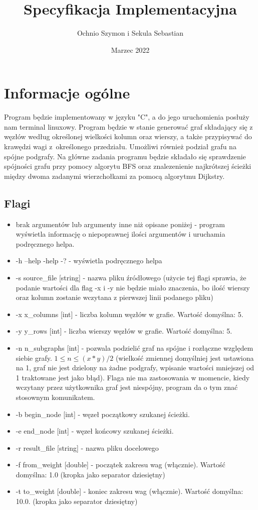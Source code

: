 \documentclass{article}
\title{Specyfikacja Implementacyjna}
\author{Ochnio Szymon i Sekula Sebastian}
\date{Marzec 2022}
\begin{document}
\maketitle

\section{Informacje ogólne}
Program będzie implementowany w języku "C", a do jego uruchomienia posłuży nam terminal linuxowy.
Program będzie w stanie generować graf składający się z węzłów według określonej wielkości kolumn oraz wierszy, a także przypisywać do krawędzi wagi z~określonego przedziału. Umożliwi również podział grafu na spójne podgrafy. Na główne zadania programu będzie składało się sprawdzenie spójności grafu przy pomocy algorytu BFS oraz znalezenienie najkrótszej ścieżki między dwoma zadanymi wierzchołkami za pomocą algorytmu Dijkstry.
\subsection{Flagi}
\begin{itemize}
    \item brak argumentów lub argumenty inne niż opisane poniżej - program wyświetla informację o niepoprawnej ilości argumentów i uruchamia podręcznego helpa.
    \item -h \textbar--help  \textbar-help \textbar-? - wyświetla podręcznego helpa
    \item -s source\_file [string] - nazwa pliku źródłowego (użycie tej flagi sprawia, że podanie wartości dla flag -x i -y nie będzie miało znaczenia, bo ilość wierszy oraz kolumn zostanie wczytana z pierwszej linii podanego pliku)
    \item -x x\_columns [int] - liczba kolumn węzłów w grafie. Wartość domyślna: 5.
    \item -y y\_rows [int] - liczba wierszy węzłów w grafie. Wartość domyślna: 5.
    \item -n n\_subgraphs [int] - pozwala podzielić graf na spójne i rozłączne względem siebie grafy. ${1 \leq n \leq (x*y)/2}$ (wielkość zmiennej domyślniej jest ustawiona na 1, graf nie jest dzielony na żadne podgrafy, wpisanie wartości mniejszej od 1 traktowane jest jako błąd). Flaga nie ma zastosowania w momencie, kiedy wczytany przez użytkownika graf jest niespójny, program da o tym znać stosownym komunikatem.
    \item -b begin\_node [int] - węzeł początkowy szukanej ścieżki. 
    \item -e end\_node [int] - węzeł końcowy szukanej ścieżki. 
    \item -r result\_file [string] - nazwa pliku docelowego
    \item -f from\_weight [double] - początek zakresu wag (włącznie). Wartość domyślna: 1.0 (kropka jako separator dziesiętny)
    \item -t to\_weight [double] - koniec zakresu wag (włącznie). Wartość domyślna: 10.0. (kropka jako separator dziesiętny)
    
\end{itemize}
\end{document}

